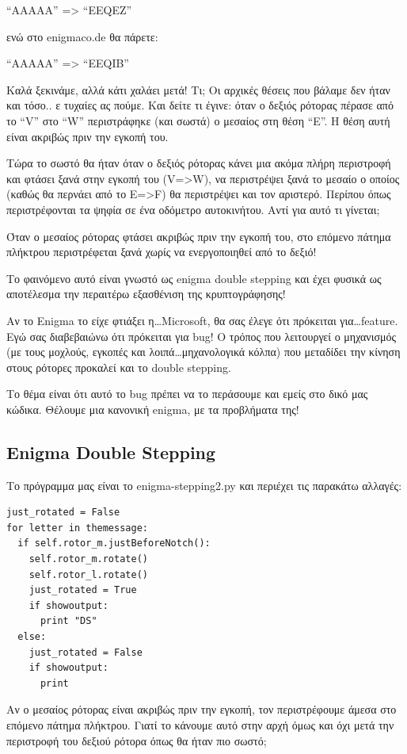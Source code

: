 \documentclass[a4paper,twoside,12pt]{article}
\begin{document}
“AAAAA” => “EEQEZ”

ενώ στο enigmaco.de θα πάρετε:

“AAAAA” => “EEQIB”

Καλά ξεκινάμε, αλλά κάτι χαλάει μετά! Τι; Οι αρχικές θέσεις που βάλαμε δεν ήταν και τόσο.. ε τυχαίες ας πούμε.  Και δείτε τι έγινε: όταν ο δεξιός ρότορας πέρασε από το “V” στο “W” περιστράφηκε (και σωστά) ο μεσαίος στη θέση “Ε”. Η θέση αυτή είναι ακριβώς πριν την εγκοπή του.

Τώρα το σωστό θα ήταν όταν ο δεξιός ρότορας κάνει μια ακόμα πλήρη περιστροφή και φτάσει ξανά στην εγκοπή του (V=>W), να περιστρέψει ξανά το μεσαίο ο οποίος (καθώς θα περνάει από το E=>F) θα περιστρέψει και τον αριστερό. Περίπου όπως περιστρέφονται τα ψηφία σε ένα οδόμετρο αυτοκινήτου. Αντί για αυτό τι γίνεται;

Όταν ο μεσαίος ρότορας φτάσει ακριβώς πριν την εγκοπή του, στο επόμενο πάτημα πλήκτρου περιστρέφεται ξανά χωρίς να ενεργοποιηθεί από το δεξιό!

Το φαινόμενο αυτό είναι γνωστό ως enigma double stepping και έχει φυσικά ως αποτέλεσμα την περαιτέρω εξασθένιση της κρυπτογράφησης!

Αν το Enigma το είχε φτιάξει η\ldots Microsoft, θα σας έλεγε ότι πρόκειται για\ldots feature. Εγώ σας διαβεβαιώνω ότι πρόκειται για bug! Ο τρόπος που λειτουργεί ο μηχανισμός (με τους μοχλούς, εγκοπές και λοιπά\ldots μηχανολογικά κόλπα) που μεταδίδει την κίνηση στους ρότορες προκαλεί και το double stepping.

Το θέμα είναι ότι αυτό το bug πρέπει να το περάσουμε και εμείς στο δικό μας κώδικα. Θέλουμε μια κανονική enigma, με τα προβλήματα της!

\subsection{Enigma Double Stepping}

Το πρόγραμμα μας είναι το enigma-stepping2.py και περιέχει τις παρακάτω αλλαγές:

\begin{verbatim}
just_rotated = False
for letter in themessage:
  if self.rotor_m.justBeforeNotch():
    self.rotor_m.rotate()
    self.rotor_l.rotate()
    just_rotated = True
    if showoutput:
      print "DS"
  else:
    just_rotated = False
    if showoutput:
      print
\end{verbatim}

Αν ο μεσαίος ρότορας είναι ακριβώς πριν την εγκοπή, τον περιστρέφουμε άμεσα στο επόμενο πάτημα πλήκτρου. Γιατί το κάνουμε αυτό στην αρχή όμως και όχι μετά την περιστροφή του δεξιού ρότορα όπως θα ήταν πιο σωστό;
\end{document}
